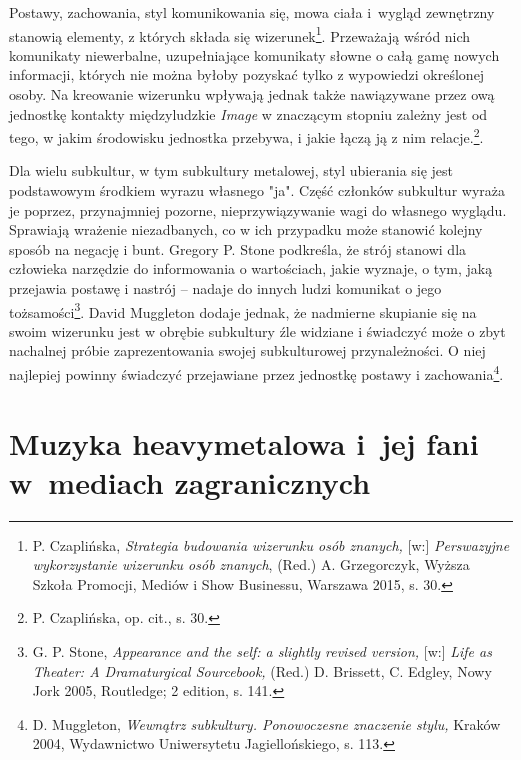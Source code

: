 \documentclass[12pt, a4paper, titlepage]{report}
\begin{document}
Postawy, zachowania, styl komunikowania się, mowa ciała i~wygląd zewnętrzny stanowią elementy, z których składa się wizerunek\footnote{P. Czaplińska, \textit{Strategia budowania wizerunku osób znanych,} [w:] \textit{Perswazyjne wykorzystanie wizerunku osób znanych}, (Red.) A. Grzegorczyk, Wyższa Szkoła Promocji, Mediów i Show Businessu, Warszawa 2015, s. 30.}. Przeważają wśród nich komunikaty niewerbalne, uzupełniające komunikaty słowne o całą gamę nowych informacji, których nie można byłoby pozyskać tylko z wypowiedzi określonej osoby. Na kreowanie wizerunku wpływają jednak także nawiązywane przez ową jednostkę kontakty międzyludzkie \textit{Image} w znaczącym stopniu zależny jest od tego, w jakim środowisku jednostka przebywa, i jakie łączą ją z nim relacje.\footnote{P. Czaplińska, op. cit., s. 30.}.


Dla wielu subkultur, w tym subkultury metalowej, styl ubierania się jest podstawowym środkiem wyrazu własnego "ja". Część członków subkultur wyraża je poprzez, przynajmniej pozorne, nieprzywiązywanie wagi do własnego wyglądu. Sprawiają wrażenie niezadbanych, co w ich przypadku może stanowić kolejny sposób na negację i bunt. Gregory P. Stone podkreśla, że strój stanowi dla człowieka narzędzie do informowania o wartościach, jakie wyznaje, o tym, jaką przejawia postawę i nastrój -- nadaje do innych ludzi komunikat o jego tożsamości\footnote{G. P. Stone, \textit{Appearance and the self: a slightly revised version,} [w:] \textit{Life as Theater: A Dramaturgical Sourcebook,} (Red.) D. Brissett, C. Edgley,  Nowy Jork 2005, Routledge; 2 edition, s. 141.}. David Muggleton dodaje jednak, że nadmierne skupianie się na swoim wizerunku jest w obrębie subkultury źle widziane i świadczyć może o zbyt nachalnej próbie zaprezentowania swojej subkulturowej przynależności. O niej najlepiej powinny świadczyć przejawiane przez jednostkę postawy i zachowania\footnote{D. Muggleton, \textit{Wewnątrz subkultury. Ponowoczesne znaczenie stylu,} Kraków 2004, Wydawnictwo Uniwersytetu Jagiellońskiego, s. 113.}.

\section{Muzyka heavymetalowa i~jej fani w~mediach zagranicznych}
\end{document}
